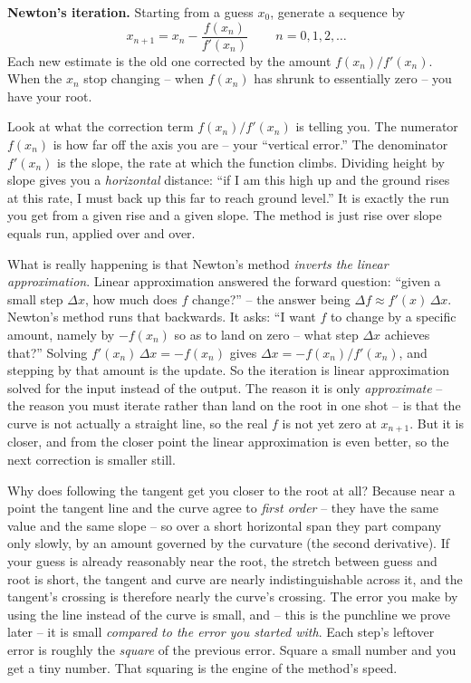 \begin{focusbox}
\textbf{Newton's iteration.} Starting from a guess $x_0$, generate a sequence by
\[
  \boxed{\,x_{n+1} = x_n - \dfrac{f(x_n)}{f'(x_n)}\,}
  \qquad n = 0, 1, 2, \ldots
\]
Each new estimate is the old one corrected by the amount $f(x_n)/f'(x_n)$. When the
$x_n$ stop changing -- when $f(x_n)$ has shrunk to essentially zero -- you have your
root.
\end{focusbox}

Look at what the correction term $f(x_n)/f'(x_n)$ is telling you. The numerator
$f(x_n)$ is how far off the axis you are -- your ``vertical error.'' The denominator
$f'(x_n)$ is the slope, the rate at which the function climbs. Dividing height by
slope gives you a \emph{horizontal} distance: ``if I am this high up and the ground
rises at this rate, I must back up this far to reach ground level.'' It is exactly
the run you get from a given rise and a given slope. The method is just rise over
slope equals run, applied over and over.

\begin{happeningbox}
What is really happening is that Newton's method \emph{inverts the linear
approximation}. Linear approximation answered the forward question: ``given a small
step $\Delta x$, how much does $f$ change?'' -- the answer being $\Delta f \approx
f'(x)\,\Delta x$. Newton's method runs that backwards. It asks: ``I want $f$ to
change by a specific amount, namely by $-f(x_n)$ so as to land on zero -- what step
$\Delta x$ achieves that?'' Solving $f'(x_n)\,\Delta x = -f(x_n)$ gives $\Delta x =
-f(x_n)/f'(x_n)$, and stepping by that amount is the update. So the iteration is
linear approximation solved for the input instead of the output. The reason it is
only \emph{approximate} -- the reason you must iterate rather than land on the root
in one shot -- is that the curve is not actually a straight line, so the real $f$ is
not yet zero at $x_{n+1}$. But it is closer, and from the closer point the linear
approximation is even better, so the next correction is smaller still.
\end{happeningbox}

\begin{whybox}
Why does following the tangent get you closer to the root at all? Because near a
point the tangent line and the curve agree to \emph{first order} -- they have the
same value and the same slope -- so over a short horizontal span they part company
only slowly, by an amount governed by the curvature (the second derivative). If
your guess is already reasonably near the root, the stretch between guess and root
is short, the tangent and curve are nearly indistinguishable across it, and the
tangent's crossing is therefore nearly the curve's crossing. The error you make by
using the line instead of the curve is small, and -- this is the punchline we prove
later -- it is small \emph{compared to the error you started with}. Each step's
leftover error is roughly the \emph{square} of the previous error. Square a small
number and you get a tiny number. That squaring is the engine of the method's
speed.
\end{whybox}

